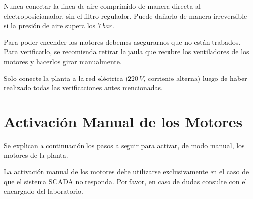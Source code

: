 \begin{lattention}
Nunca conectar la linea de aire comprimido de manera directa al
electroposicionador,
sin el filtro regulador.
Puede dañarlo de manera irreversible si la presión de aire
supera los $7\,bar$.
\end{lattention}

\begin{tcolorbox}[title=Motores]
Para poder encender los motores debemos asegurarnos que no están trabados.
Para verificarlo, se recomienda retirar la jaula que recubre los ventiladores
de los motores y hacerlos girar manualmente.
\end {tcolorbox}

\begin{lattention}
Solo conecte la planta a la red eléctrica ($220\,V$, corriente alterna) luego 
de haber realizado todas las verificaciones antes mencionadas. 
\end{lattention}

\section{Activación Manual de los Motores}
\label{anexo:motoresManual}
Se explican a continuación los pasos a seguir para activar, de modo manual, los
motores de la planta.
 \begin{lattention}
 La activación manual de los motores debe utilizarse exclusivamente en el caso
de que el sistema SCADA no responda.
Por favor, en caso de dudas consulte con el encargado del laboratorio.
\end{lattention}


